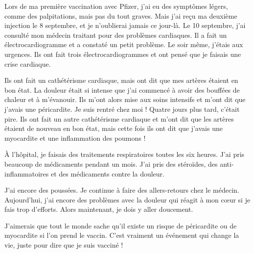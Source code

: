 Lors de ma première vaccination avec Pfizer, j'ai eu des symptômes légers, comme
des palpitations, mais pas du tout graves. Mais j'ai reçu ma deuxième injection
le 8 septembre, et je n'oublierai jamais ce jour-là. Le 10 septembre, j'ai
consulté mon médecin traitant pour des problèmes cardiaques. Il a fait un
électrocardiogramme et a constaté un petit problème. Le soir même, j'étais aux
urgences. Ils ont fait trois électrocardiogrammes et ont pensé que je faisais
une crise cardiaque.

Ils ont fait un cathétérisme cardiaque, mais ont dit que mes artères étaient en
bon état. La douleur était si intense que j'ai commencé à avoir des bouffées de
chaleur et à m'évanouir. Ils m'ont alors mise aux soins intensifs et m'ont dit
que j'avais une péricardite. Je suis rentré chez moi ! Quatre jours plus tard,
c'était pire. Ils ont fait un autre cathétérisme cardiaque et m'ont dit que les
artères étaient de nouveau en bon état, mais cette fois ils ont dit que j'avais
une myocardite et une inflammation des poumons !

À l'hôpital, je faisais des traitements respiratoires toutes les six
heures. J'ai pris beaucoup de médicaments pendant un mois. J'ai pris des
stéroïdes, des anti-inflammatoires et des médicaments contre la douleur.

J'ai encore des poussées. Je continue à faire des allers-retours chez le
médecin. Aujourd'hui, j'ai encore des problèmes avec la douleur qui réagit à mon
cœur si je fais trop d'efforts. Alors maintenant, je dois y aller doucement.

J'aimerais que tout le monde sache qu'il existe un risque de péricardite ou de
myocardite si l'on prend le vaccin. C'est vraiment un événement qui change la
vie, juste pour dire que je suis vacciné !
